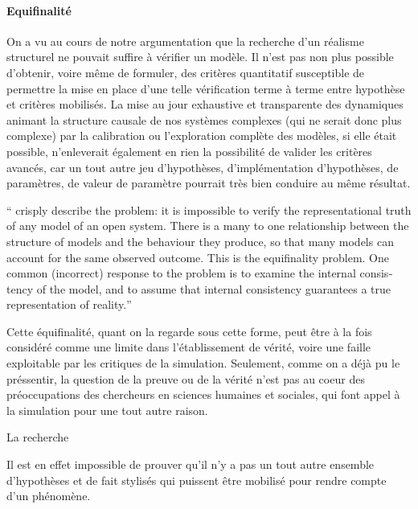 
\paragraph{Equifinalité}

On a vu au cours de notre argumentation que la recherche d'un réalisme structurel ne pouvait suffire à vérifier un modèle. Il n'est pas non plus possible d'obtenir, voire même de formuler, des critères quantitatif susceptible de permettre la mise en place d'une telle vérification terme à terme entre hypothèse et critères mobilisés. La mise au jour exhaustive et transparente des dynamiques animant la structure causale de nos systèmes complexes (qui ne serait donc plus complexe) par la calibration ou l'exploration complète des modèles, si elle était possible, n'enleverait également en rien la possibilité de valider les critères avancés, car un tout autre jeu d'hypothèses, d'implémentation d'hypothèses, de paramètres, de valeur de paramètre pourrait très bien conduire au même résultat.


\foreignquote{english}{\textcite{Oreske1994} crisply describe the problem: it is impossible to verify the representational truth of any model of an open system. There  is a many to one relationship between the structure of models and the behaviour they produce, so that many models can account for the same observed outcome. This is the equifinality problem. One common (incorrect) response to the problem is to examine the internal consistency of the model, and to assume that internal consistency guarantees a true representation of reality.} 

Cette équifinalité, quant on la regarde sous cette forme, peut être à la fois considéré comme une limite dans l'établissement de vérité, voire une faille exploitable par les critiques de la simulation. Seulement, comme on a déjà pu le préssentir, la question de la preuve ou de la vérité n'est pas au coeur des préoccupations des chercheurs en sciences humaines et sociales, qui font appel à la simulation pour une tout autre raison. 



La recherche 

Il est en effet impossible de prouver qu'il n'y a pas un tout autre ensemble d'hypothèses et de fait stylisés qui puissent être mobilisé pour rendre compte d'un phénomène. 

